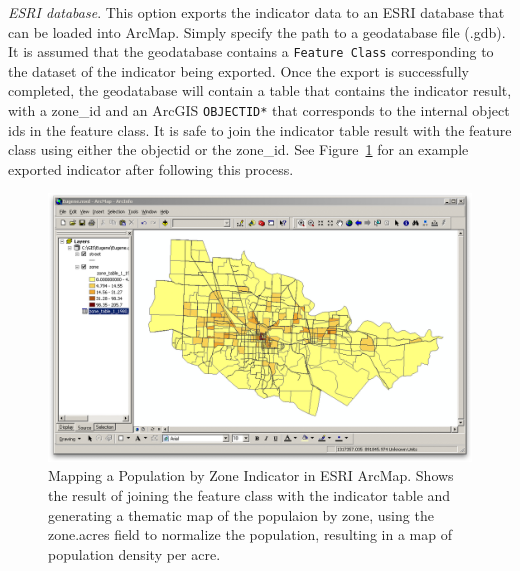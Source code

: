 \emph{ESRI database}. This option exports the
indicator data to an ESRI database that can be loaded into ArcMap.
Simply specify the path to a geodatabase file (.gdb). It is assumed 
that the geodatabase contains a \verb#Feature Class# corresponding to
the dataset of the indicator being exported. Once the export is
successfully completed, the geodatabase will contain a table that 
contains the indicator result, with a zone\_id and an
ArcGIS \verb#OBJECTID*# that corresponds to the internal object ids in
the feature class. It is safe to join the indicator table result with
the feature class using either the objectid or the zone\_id. See
Figure~\ref{fig:indicator-population-zone-arcgis} for an example
exported indicator after following this process. 

\begin{figure}[htp]
\begin{center}
\includegraphics[width=.8\textwidth]{part-gui/images/result-manager-indicator-population-zone-arcgis.png}
\end{center}
\caption{Mapping a Population by Zone Indicator in ESRI ArcMap. Shows the result of
joining the feature class with the indicator table and generating a thematic map of the populaion by zone, using the zone.acres field to
normalize the population, resulting in a map of population density per
acre.}
\label{fig:indicator-population-zone-arcgis}
\end{figure}


